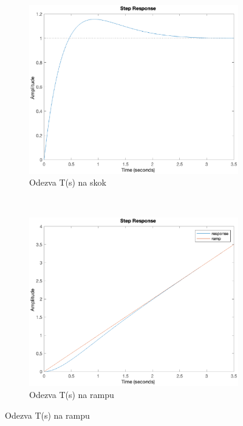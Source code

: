 \documentclass{article}
\begin{document}
\begin{itemize}
    \subsection{}
    \begin{figure}[H]
        \centering
        \begin{subfigure}[b]{0.45\textwidth}
            \includegraphics[width=\textwidth]{Step_response.eps}
            \caption{Odezva T(s) na skok}
            \label{fig:Step_response}
        \end{subfigure}
        ~
        \begin{subfigure}[b]{0.45\textwidth}
            \includegraphics[width=\textwidth]{ramp_response.eps}
            \caption{Odezva T(s) na rampu}
            \label{fig:Ramp_response}
        \end{subfigure}
     
        \label{fig:13cIICompare}
    \end{figure}
    
\end{itemize}
\end{document}
